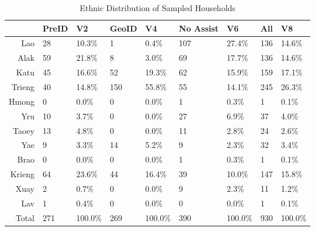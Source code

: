 \begin{table}[ht]
\centering
\begin{tabular}{rllllllll}
  \hline
 & PreID & V2 & GeoID & V4 & No Assist & V6 & All & V8 \\ 
  \hline
Lao & 28 & 10.3\% & 1 & 0.4\% & 107 & 27.4\% & 136 & 14.6\% \\ 
  Alak & 59 & 21.8\% & 8 & 3.0\% & 69 & 17.7\% & 136 & 14.6\% \\ 
  Katu & 45 & 16.6\% & 52 & 19.3\% & 62 & 15.9\% & 159 & 17.1\% \\ 
  Trieng & 40 & 14.8\% & 150 & 55.8\% & 55 & 14.1\% & 245 & 26.3\% \\ 
  Hmong & 0 & 0.0\% & 0 & 0.0\% & 1 & 0.3\% & 1 & 0.1\% \\ 
  Yru & 10 & 3.7\% & 0 & 0.0\% & 27 & 6.9\% & 37 & 4.0\% \\ 
  Taoey & 13 & 4.8\% & 0 & 0.0\% & 11 & 2.8\% & 24 & 2.6\% \\ 
  Yae & 9 & 3.3\% & 14 & 5.2\% & 9 & 2.3\% & 32 & 3.4\% \\ 
  Brao & 0 & 0.0\% & 0 & 0.0\% & 1 & 0.3\% & 1 & 0.1\% \\ 
  Krieng & 64 & 23.6\% & 44 & 16.4\% & 39 & 10.0\% & 147 & 15.8\% \\ 
  Xuay & 2 & 0.7\% & 0 & 0.0\% & 9 & 2.3\% & 11 & 1.2\% \\ 
  Lav & 1 & 0.4\% & 0 & 0.0\% & 0 & 0.0\% & 1 & 0.1\% \\ 
  Total & 271 & 100.0\% & 269 & 100.0\% & 390 & 100.0\% & 930 & 100.0\% \\ 
   \hline
\end{tabular}
\caption{Ethnic Distribution of Sampled Households} 
\end{table}
